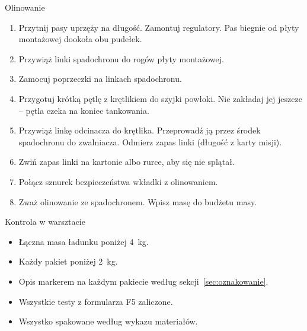 \begin{sekcja}{Olinowanie}
\begin{enumerate}
  \item Przytnij pasy uprzęży na długość. Zamontuj regulatory. Pas biegnie od płyty montażowej dookoła obu pudełek.
  \item Przywiąż linki spadochronu do rogów płyty montażowej.
  \item Zamocuj poprzeczki na linkach spadochronu.
  \item Przygotuj krótką pętlę z krętlikiem do szyjki powłoki. Nie zakładaj jej jeszcze -- pętla czeka na koniec tankowania.
  \item Przywiąż linkę odcinacza do krętlika. Przeprowadź ją przez środek spadochronu do zwalniacza. Odmierz zapas linki (długość z karty misji).
  \item Zwiń zapas linki na kartonie albo rurce, aby się nie splątał.
  \item Połącz sznurek bezpieczeństwa wkładki z olinowaniem.
  \item Zważ olinowanie ze spadochronem. Wpisz masę do budżetu masy.
\end{enumerate}
\end{sekcja}

\begin{sekcja}{Kontrola w warsztacie}
\begin{itemize}
  \item[\kratka] Łączna masa ładunku poniżej \SI{4}{kg}.
  \item[\kratka] Każdy pakiet poniżej \SI{2}{kg}.
  \item[\kratka] Opis markerem na każdym pakiecie według sekcji~\ref{sec:oznakowanie}.
  \item[\kratka] Wszystkie testy z formularza F5 zaliczone.
  \item[\kratka] Wszystko spakowane według wykazu materiałów.
\end{itemize}
\end{sekcja}

